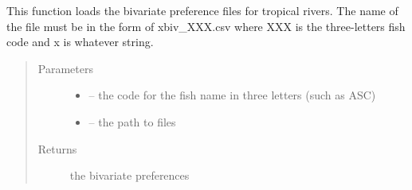 \documentclass[letterpaper,10pt,english]{sphinxmanual}
\begin{document}
\begin{fulllineitems}
\label{\detokenize{index:src.stathab_c.load_pref_trop_biv}}
This function loads the bivariate preference files for tropical rivers. The name of the file must be in the form
of xbiv\_XXX.csv where XXX is the three-letters fish code and x is whatever string.
\begin{quote}\begin{description}
\item[{Parameters}] \leavevmode\begin{itemize}
\item {} 
 -- the code for the fish name in three letters (such as ASC)

\item {} 
 -- the path to files

\end{itemize}

\item[{Returns}] \leavevmode
the bivariate preferences

\end{description}\end{quote}

\end{fulllineitems}

\end{document}

